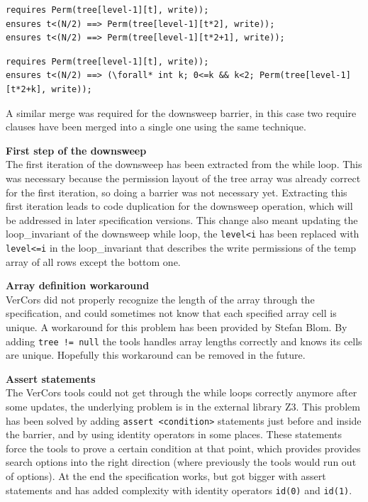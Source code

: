 \documentclass[a4paper]{article}
\newcommand{\code}[1]{\texttt{\small \color{inline}#1}} %
\begin{document}
\begin{lstlisting}[caption=Upsweep barrier permissions clauses (before merging), label=listing:specPreviousBarrier, float=htpb]
requires Perm(tree[level-1][t], write));
ensures t<(N/2) ==> Perm(tree[level-1][t*2], write));
ensures t<(N/2) ==> Perm(tree[level-1][t*2+1], write));
\end{lstlisting}

\begin{lstlisting}[caption=Upsweep barrier permissions clauses (after merging), label=listing:specBasicBarrier, float=htpb]
requires Perm(tree[level-1][t], write));
ensures t<(N/2) ==> (\forall* int k; 0<=k && k<2; Perm(tree[level-1][t*2+k], write));
\end{lstlisting}

A similar merge was required for the downsweep barrier, in this case two require clauses have been merged into a single one using the same technique.

\textbf{First step of the downsweep}\\
The first iteration of the downsweep has been extracted from the while loop. This was necessary because the permission layout of the tree array was already correct for the first iteration, so doing a barrier was not necessary yet. Extracting this first iteration leads to code duplication for the downsweep operation, which will be addressed in later specification versions. This change also meant updating the loop\_invariant of the downsweep while loop, the \code{level<i} has been replaced with \code{level<=i} in the loop\_invariant that describes the write permissions of the temp array of all rows except the bottom one.

\textbf{Array definition workaround}\\
VerCors did not properly recognize the length of the array through the specification, and could sometimes not know that each specified array cell is unique. A workaround for this problem has been provided by Stefan Blom. By adding \code{tree != null} the tools handles array lengths correctly and knows its cells are unique. Hopefully this workaround can be removed in the future.

\textbf{Assert statements}\\
The VerCors tools could not get through the while loops correctly anymore after some updates, the underlying problem is in the external library Z3. This problem has been solved by adding \code{assert <condition>} statements just before and inside the barrier, and by using identity operators in some places. These statements force the tools to prove a certain condition at that point, which provides provides search options into the right direction (where previously the tools would run out of options). At the end the specification works, but got bigger with assert statements and has added complexity with identity operators \code{id(0)} and \code{id(1)}.
\end{document}
